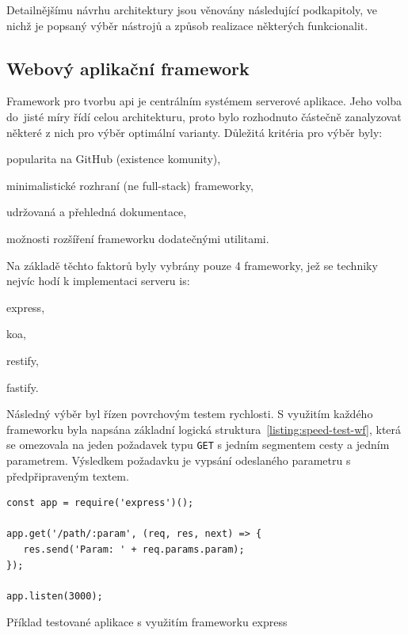 Detailnějšímu návrhu architektury jsou věnovány následující podkapitoly, ve nichž je popsaný výběr nástrojů a způsob realizace některých funkcionalit.




\subsection{Webový aplikační framework}

Framework pro tvorbu \gls{api} je centrálním systémem serverové aplikace. Jeho volba do~jisté míry řídí celou architekturu, proto bylo rozhodnuto částečně zanalyzovat některé z nich pro výběr optimální varianty. Důležitá kritéria pro výběr byly:

\begin{ulnar}
   \item popularita na GitHub (existence komunity),
   \item minimalistické rozhraní (ne full-stack) frameworky,
   \item udržovaná a přehledná dokumentace,
   \item možnosti rozšíření frameworku dodatečnými utilitami.
\end{ulnar}


Na základě těchto faktorů byly vybrány pouze 4 frameworky, jež se techniky nejvíc hodí k implementaci serveru \gls{is}:

\begin{ulnar}
   \item express,
   \item koa,
   \item restify,
   \item fastify.
\end{ulnar}

Následný výběr byl řízen povrchovým testem rychlosti. S využitím každého frameworku byla napsána základní logická struktura~\ref{listing:speed-test-wf}, která se omezovala na jeden požadavek typu \texttt{GET} s jedním segmentem cesty a jedním parametrem. Výsledkem požadavku je vypsání odeslaného parametru s předpřipraveným textem.

\begin{fig:code}
	\begin{verbatim}
const app = require('express')();

app.get('/path/:param', (req, res, next) => {
   res.send('Param: ' + req.params.param);
});

app.listen(3000);
   \end{verbatim}
   \caption{Příklad testované aplikace s využitím frameworku express}\label{listing:speed-test-wf}
\end{fig:code}

